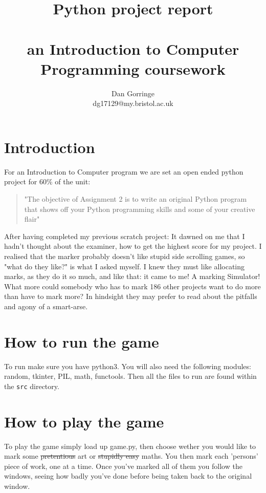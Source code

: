 \documentclass[twocolumn]{article}   %
\begin{document}

  \title{Python project report \\~\\  \small{an Introduction to Computer Programming coursework}}    %

  \author{\color{orange} {Dan Gorringe} \\ \small{\color{orange}dg17129@my.bristol.ac.uk}}        %
  \maketitle


\section{Introduction}

For an Introduction to Computer program we are set an open ended python project for 60\% of the unit:
  \begin{quote}
    "The objective of Assignment 2 is to write an original Python program that shows off
your Python programming skills and some of your creative flair"
  \end{quote}

After having completed my previous scratch project: It dawned on me that I hadn't thought about the examiner, how to get the highest score for my project. I realised that the marker probably doesn't like stupid side scrolling games, so "what do they like?" is what I asked myself. I knew they must like allocating marks, as they do it so much, and like that: it came to me! A marking Simulator! What more could somebody who has to mark 186 other projects want to do more than have to mark more? In hindsight they may prefer to read about the pitfalls and agony of a smart-arse.

\section{How to run the game}
To run make sure you have python3. You will also need the following modules: random, tkinter, PIL, math, functools. Then all the files to run are found within the \texttt{src} directory.

\section{How to play the game}
To play the game simply load up game.py, then choose wether you would like to mark some \st{pretentious} art or \st{stupidly easy} maths. You then mark each 'persons' piece of work, one at a time. Once you've marked all of them you follow the windows, seeing how badly you've done before being taken back to the original window.
\end{document}
